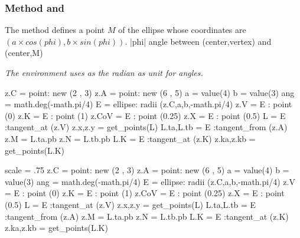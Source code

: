 \subsubsection{Method  and } %
\label{ssub:ellipse_method_point}
 The method  defines a point $M$ of the ellipse whose coordinates are $(a\times  cos(phi), b\times sin(phi))$. |phi| angle between (center,vertex) and (center,M)

 \emph{The environment  uses as  the radian as unit for angles. }


\begin{minipage}{0.6\textwidth}
\begin{tkzexample}[latex=0cm,small,code only]
\begin{tkzelements}
   z.C         = point: new (2 , 3)
   z.A         = point: new (6 , 5)
   a           = value(4)
   b           = value(3)
   ang         = math.deg(-math.pi/4)
   E           = ellipse: radii (z.C,a,b,-math.pi/4)
   z.V         = E : point (0)
   z.K         = E : point (1)
   z.CoV       = E : point (0.25)
   z.X         = E : point (0.5)
   L           = E :tangent_at (z.V)
   z.x,z.y     = get_points(L)
   L.ta,L.tb   = E :tangent_from (z.A)
   z.M         = L.ta.pb
   z.N         = L.tb.pb
   L.K         = E :tangent_at (z.K)
   z.ka,z.kb   = get_points(L.K)
\end{tkzelements}
\end{tkzexample}
\end{minipage}
\begin{minipage}{0.4\textwidth}
\begin{tkzelements}
scale       = .75
z.C         = point: new (2 , 3)
z.A         = point: new (6 , 5)
a           = value(4)
b           = value(3)
ang         = math.deg(-math.pi/4)
E           = ellipse: radii (z.C,a,b,-math.pi/4)
z.V         = E : point (0)
z.K         = E : point (1)
z.CoV       = E : point (0.25)
z.X         = E : point (0.5)
L           = E :tangent_at (z.V)
z.x,z.y     = get_points(L)
L.ta,L.tb   = E :tangent_from (z.A)
z.M         = L.ta.pb
z.N         = L.tb.pb
L.K         = E :tangent_at (z.K)
z.ka,z.kb   = get_points(L.K)
\end{tkzelements}
\end{minipage}

\endinput